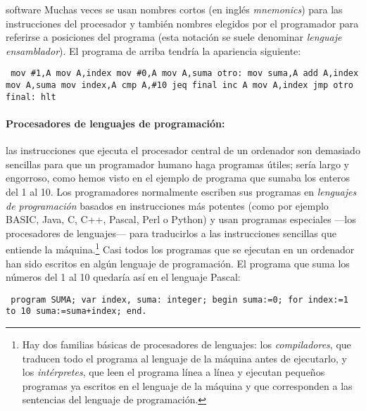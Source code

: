 \begin{persabermes}{software}
Muchas veces se usan nombres cortos (en inglés \emph{mnemonics}) para las instrucciones del procesador y también nombres elegidos por el programador para referirse a posiciones del programa (esta notación se suele denominar \emph{lenguaje ensamblador}). El programa de arriba tendría la apariencia siguiente: \begin{verbatim} mov #1,A mov A,index mov #0,A mov A,suma otro: mov suma,A add A,index mov A,suma mov index,A cmp A,#10 jeq final inc A mov A,index jmp otro final: hlt \end{verbatim} 

\paragraph{Procesadores de lenguajes de programación:} las instrucciones que ejecuta el procesador central de un ordenador son demasiado sencillas para que un programador humano haga programas útiles; sería largo y engorroso, como hemos visto en el ejemplo de programa que sumaba los enteros del 1 al 10. Los programadores normalmente escriben sus programas en {\em lenguajes de programación} basados en instrucciones más potentes (como por ejemplo BASIC, Java, C, C++, Pascal, Perl o Python) y usan programas especiales ---los procesadores de lenguajes--- para traducirlos a las instrucciones sencillas que entiende la máquina.\footnote{Hay dos familias básicas de procesadores de lenguajes: los \emph{compiladores}, que traducen todo el programa al lenguaje de la máquina antes de ejecutarlo, y los \emph{intérpretes}, que leen el programa línea a línea y ejecutan pequeños programas ya escritos en el lenguaje de la máquina y que corresponden a las sentencias del lenguaje de programación.} Casi todos los programas que se ejecutan en un ordenador han sido escritos en algún lenguaje de programación. El programa que suma los números del 1 al 10 quedaría así en el lenguaje Pascal: \begin{verbatim} program SUMA; var index, suma: integer; begin suma:=0; for index:=1 to 10 suma:=suma+index; end. \end{verbatim} 


\end{persabermes}
